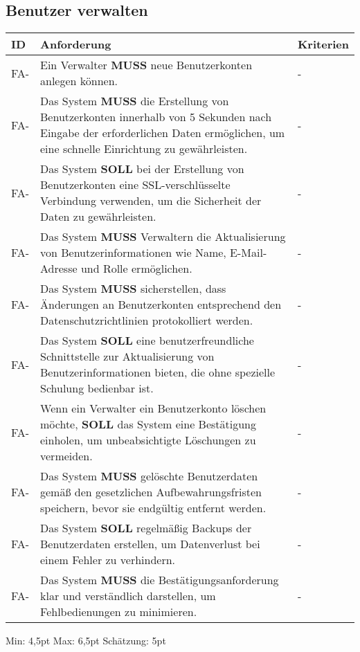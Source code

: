 \subsection{Benutzer verwalten}
\begin{tabular} {|p{}|p{11cm}|p{}|}
	\hline
	ID & Anforderung & Kriterien \\
	\hline
	FA-
	& Ein Verwalter \textbf{MUSS} neue Benutzerkonten anlegen können. 
	& - \\
	\hline
	FA-
	& Das System \textbf{MUSS} die Erstellung von Benutzerkonten innerhalb von 5 Sekunden nach Eingabe der erforderlichen Daten ermöglichen, um eine schnelle Einrichtung zu gewährleisten. 
	& - \\ 
	\hline
	FA-
	& Das System \textbf{SOLL} bei der Erstellung von Benutzerkonten eine SSL-verschlüsselte Verbindung verwenden, um die Sicherheit der Daten zu gewährleisten.
	& - \\ 
	\hline
	FA-
	& Das System \textbf{MUSS} Verwaltern die Aktualisierung von Benutzerinformationen wie Name, E-Mail-Adresse und Rolle ermöglichen.
	& - \\ 
	\hline
	FA-
	& Das System \textbf{MUSS} sicherstellen, dass Änderungen an Benutzerkonten entsprechend den Datenschutzrichtlinien protokolliert werden.
	& - \\ 
	\hline
	FA-
	& Das System \textbf{SOLL} eine benutzerfreundliche Schnittstelle zur Aktualisierung von Benutzerinformationen bieten, die ohne spezielle Schulung bedienbar ist.
	& - \\ 
	\hline
	FA-
	& Wenn ein Verwalter ein Benutzerkonto löschen möchte, \textbf{SOLL} das System eine Bestätigung einholen, um unbeabsichtigte Löschungen zu vermeiden.
	& - \\ 
	\hline
	FA-
	& Das System \textbf{MUSS} gelöschte Benutzerdaten gemäß den gesetzlichen Aufbewahrungsfristen speichern, bevor sie endgültig entfernt werden.
	& - \\ 
	\hline
	FA-
	& Das System \textbf{SOLL} regelmäßig Backups der Benutzerdaten erstellen, um Datenverlust bei einem Fehler zu verhindern.
	& - \\ 
	\hline
	FA-
	& Das System \textbf{MUSS} die Bestätigungsanforderung klar und verständlich darstellen, um Fehlbedienungen zu minimieren.
	& - \\ 
	\hline
\end{tabular}
Min: 4,5pt
Max: 6,5pt
Schätzung: 5pt

\newpage

